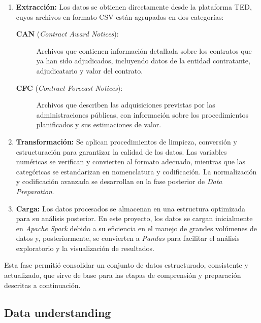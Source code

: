 \documentclass[a4paper,fleqn]{cas-sc}
\begin{document}
\begin{enumerate}
\item \textbf{Extracción:} Los datos se obtienen directamente desde la plataforma TED, cuyos  
archivos en formato CSV están agrupados en dos categorías: 

\begin{description}
        \item[\textbf{CAN} (\textit{Contract Award Notices}):] Archivos que contienen información detallada sobre los contratos que ya han sido adjudicados, incluyendo datos de la entidad contratante, adjudicatario y valor del contrato.

	\item[\textbf{CFC} (\textit{Contract Forecast Notices}):] Archivos que describen las adquisiciones previstas por las administraciones públicas, con información sobre los procedimientos planificados y sus estimaciones de valor.
	
\end{description}

\item \textbf{Transformación:}  
Se aplican procedimientos de limpieza, conversión y estructuración para garantizar la calidad de los datos. 
Las variables numéricas se verifican y convierten al formato adecuado, mientras que las categóricas se estandarizan en nomenclatura y codificación. 
La normalización y codificación avanzada se desarrollan en la fase posterior de \textit{Data Preparation}.

\item \textbf{Carga:} Los datos procesados se almacenan en una estructura optimizada para su análisis posterior. En este proyecto, los datos se cargan inicialmente en \textit{Apache Spark} debido a su eficiencia en el manejo de grandes volúmenes de datos y, posteriormente, se convierten a \textit{Pandas} para facilitar el análisis exploratorio y la visualización de resultados.

\end{enumerate}

\noindent Esta fase permitió consolidar un conjunto de datos estructurado, consistente y actualizado, que sirve de base para las etapas de comprensión y preparación descritas a continuación.



\subsection*{Data understanding}\label{sec:fase5-iteracion1}
\end{document}
